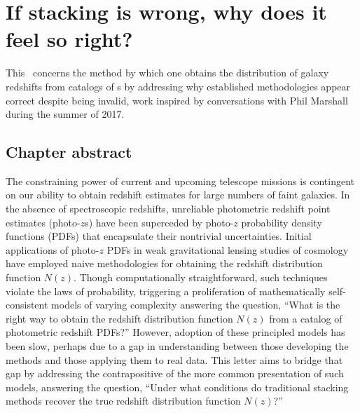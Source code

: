 \renewcommand{\chapid}{pedant}

\newcommand{\ntot}{\ensuremath{N_{\mathrm{tot}}}}
\newcommand{\ndphi}{\bvec{\phi}}


\chapter{ If stacking is wrong, why does it feel so right?  }

This \paper\ concerns the method by which one obtains the distribution of galaxy redshifts from catalogs of \pzpdf s by addressing why established methodologies appear correct despite being invalid, work inspired by conversations with Phil Marshall during the summer of 2017.

\section*{Chapter abstract}

The constraining power of current and upcoming telescope missions is contingent on our ability to obtain redshift estimates for large numbers of faint galaxies.
In the absence of spectroscopic redshifts, unreliable photometric redshift point estimates (photo-$z$s) have been superceded by photo-$z$ probability density functions (PDFs) that encapsulate their nontrivial uncertainties.
Initial applications of photo-$z$ PDFs in weak gravitational lensing studies of cosmology have employed naive methodologies for obtaining the redshift distribution function $N(z)$.
Though computationally straightforward, such techniques violate the laws of probability, triggering a proliferation of mathematically self-consistent models of varying complexity answering the question, ``What is the right way to obtain the redshift distribution function $N(z)$ from a catalog of photometric redshift PDFs?''
However, adoption of these principled models has been slow, perhaps due to a gap in understanding between those developing the methods and those applying them to real data.
This letter aims to bridge that gap by addressing the contrapositive of the more common presentation of such models, answering the question, ``Under what conditions do traditional stacking methods recover the true redshift distribution function $N(z)$?''


